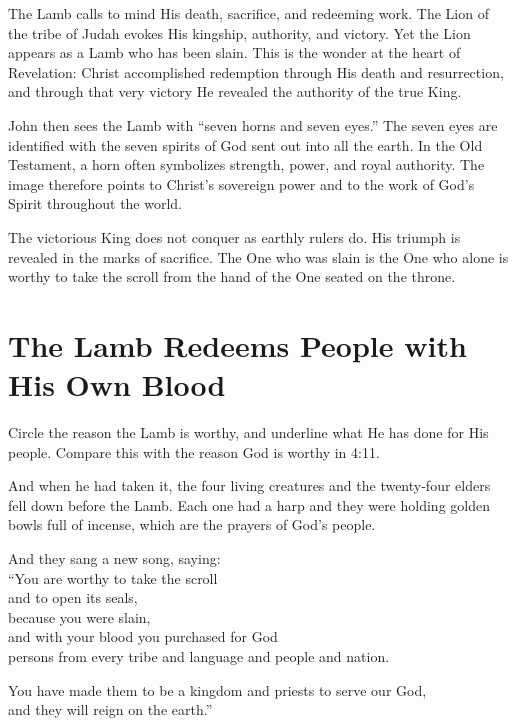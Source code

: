 The Lamb calls to mind His death, sacrifice, and redeeming work. The Lion of the tribe of Judah evokes His kingship, authority, and victory. Yet the Lion appears as a Lamb who has been slain. This is the wonder at the heart of Revelation: Christ accomplished redemption through His death and resurrection, and through that very victory He revealed the authority of the true King.

John then sees the Lamb with ``seven horns and seven eyes.'' The seven eyes are identified with the seven spirits of God sent out into all the earth. In the Old Testament, a horn often symbolizes strength, power, and royal authority. The image therefore points to Christ's sovereign power and to the work of God's Spirit throughout the world.

The victorious King does not conquer as earthly rulers do. His triumph is revealed in the marks of sacrifice. The One who was slain is the One who alone is worthy to take the scroll from the hand of the One seated on the throne.

\section{The Lamb Redeems People with His Own Blood}

\begin{ScriptureBox2}{Circle the reason the Lamb is worthy, and underline what He has done for His people. Compare this with the reason God is worthy in 4:11.}

\item[5:8] And when he had taken it, the four living creatures and the twenty-four elders fell down before the Lamb. Each one had a harp and they were holding golden bowls full of incense, which are the prayers of God's people.

\item[5:9] And they sang a new song, saying:\\
\hspace*{1.5em}``You are worthy to take the scroll\\
\hspace*{1.5em}and to open its seals,\\
\hspace*{1.5em}because you were slain,\\
\hspace*{1.5em}and with your blood you purchased for God\\
\hspace*{1.5em}persons from every tribe and language and people and nation.

\item[5:10] \hspace*{1.5em}You have made them to be a kingdom and priests to serve our God,\\
\hspace*{1.5em}and they will reign on the earth.''

\end{ScriptureBox2}


